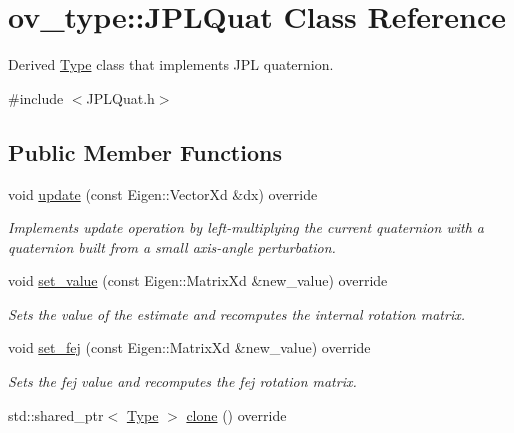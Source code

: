 \hypertarget{classov__type_1_1JPLQuat}{}\section{ov\+\_\+type\+:\+:J\+P\+L\+Quat Class Reference}
\label{classov__type_1_1JPLQuat}


Derived \hyperlink{classov__type_1_1Type}{Type} class that implements J\+PL quaternion.  




{\ttfamily \#include $<$J\+P\+L\+Quat.\+h$>$}

\subsection*{Public Member Functions}
\begin{DoxyCompactItemize}
\item 
void \hyperlink{classov__type_1_1JPLQuat_af0a26f1b03bc7c89abad5dfd985c61cd}{update} (const Eigen\+::\+Vector\+Xd \&dx) override
\begin{DoxyCompactList}\small\item\em Implements update operation by left-\/multiplying the current quaternion with a quaternion built from a small axis-\/angle perturbation. \end{DoxyCompactList}\item 
void \hyperlink{classov__type_1_1JPLQuat_a51847b09cfc48c3d869d08ecd7f4821d}{set\+\_\+value} (const Eigen\+::\+Matrix\+Xd \&new\+\_\+value) override
\begin{DoxyCompactList}\small\item\em Sets the value of the estimate and recomputes the internal rotation matrix. \end{DoxyCompactList}\item 
void \hyperlink{classov__type_1_1JPLQuat_ae631d6cf4ed4170234272be498fd22e3}{set\+\_\+fej} (const Eigen\+::\+Matrix\+Xd \&new\+\_\+value) override
\begin{DoxyCompactList}\small\item\em Sets the fej value and recomputes the fej rotation matrix. \end{DoxyCompactList}\item 
\mbox{\label{classov__type_1_1JPLQuat_a1a85597f2096605d2ddbee7c449bf4bc}} 
std\+::shared\+\_\+ptr$<$ \hyperlink{classov__type_1_1Type}{Type} $>$ \hyperlink{classov__type_1_1JPLQuat_a1a85597f2096605d2ddbee7c449bf4bc}{clone} () override

\end{DoxyCompactItemize}
